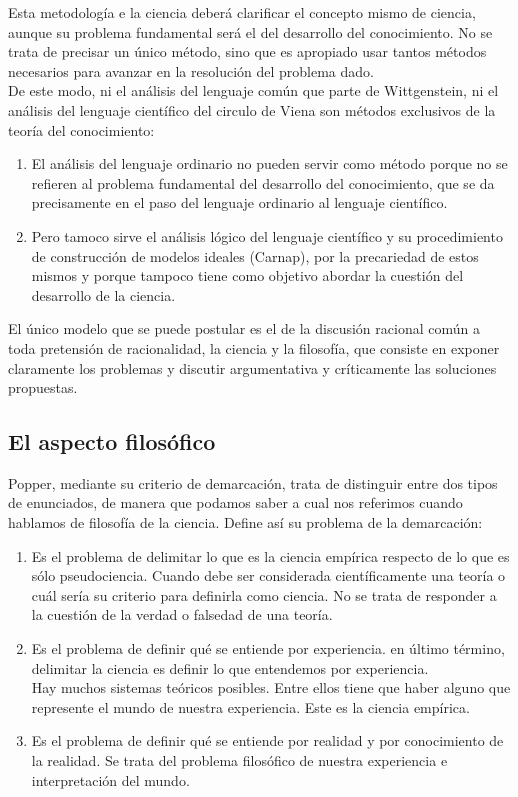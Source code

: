 \documentclass[a4paper, 11pt, twocolumn, spanish]{article}
\begin{document}
Esta metodología e la ciencia deberá clarificar el concepto mismo de
ciencia, aunque su problema fundamental será el del desarrollo del
conocimiento. No se trata de precisar un único método, sino que es
apropiado usar tantos métodos necesarios para avanzar en la resolución
del problema dado.\\[0pt]
De este modo, ni el análisis del lenguaje común que parte de
Wittgenstein, ni el análisis del lenguaje científico del circulo de
Viena son métodos exclusivos de la teoría del conocimiento:
\begin{enumerate}
\item El análisis del lenguaje ordinario no pueden servir como método
porque no se refieren al problema fundamental del desarrollo del
conocimiento, que se da precisamente en el paso del lenguaje
ordinario al lenguaje científico.
\item Pero tamoco sirve el análisis lógico del lenguaje científico y su
procedimiento de construcción de modelos ideales (Carnap), por la
precariedad de estos mismos y porque tampoco tiene como objetivo
abordar la cuestión del desarrollo de la ciencia.
\end{enumerate}

El único modelo que se puede postular es el de la discusión racional
común a toda pretensión de racionalidad, la ciencia y la filosofía,
que consiste en exponer claramente los problemas y discutir
argumentativa y críticamente las soluciones propuestas.

\subsection{El aspecto filosófico}
\label{sec:orgb4e8a94}
Popper, mediante su criterio de demarcación, trata de distinguir entre
dos tipos de enunciados, de manera que podamos saber a cual nos
referimos cuando hablamos de filosofía de la ciencia. Define así su
problema de la demarcación:
\begin{enumerate}
\item Es el problema de delimitar lo que es la ciencia empírica respecto
de lo que es sólo pseudociencia. Cuando debe ser considerada
científicamente una teoría o cuál sería su criterio para
definirla como ciencia. No se trata de responder a la cuestión de
la verdad o falsedad de una teoría.
\item Es el problema de definir qué se entiende por experiencia. en
último término, delimitar la ciencia es definir lo que entendemos
por experiencia.\\[0pt]
Hay muchos sistemas teóricos posibles. Entre ellos tiene que
haber alguno que represente el mundo de nuestra experiencia. Este
es la ciencia empírica.
\item Es el problema de definir qué se entiende por realidad y por
conocimiento de la realidad. Se trata del problema filosófico de
nuestra experiencia e interpretación del mundo.
\end{enumerate}
\end{document}
